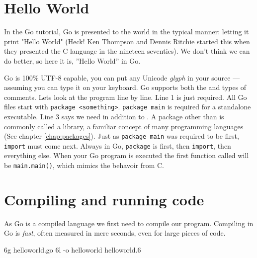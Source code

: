 \section{Hello World}
\label{sec:hello world}
In the Go tutorial, Go is presented to the world in the typical
manner: letting it print "Hello World" (Heck! Ken Thompson and
Dennis Ritchie started this when they presented the C language in 
the nineteen seventies). We don't think we can do better, so 
here it is, ''Hello World'' in Go.


Go is 100\% UTF-8 capable, you can put any Unicode
\emph{glyph} in your source --- assuming you can type it on your keyboard.
Go supports both the \texttt{\rem{/* */}} and \texttt{\rem{//}} types of comments. 
Lets look at the program line by line.
Line 1 is just required.  All Go files start with \lstinline{package <something>}.
\lstinline{package main} is required for a standalone executable.  Line 3 says
we need  in addition to .  A package other than
 is commonly called a library, a familiar concept of many programming
languages (See chapter \ref{chap:packages}). 
Just as \lstinline{package main} was required to be first, 
\lstinline{import} must come next. Always in Go, \lstinline{package} is first, then
\lstinline{import}, then everything else.
When your Go program is executed the first function called will be
\lstinline{main.main()}, which mimics the behavoir from C.

\section{Compiling and running code}
As Go is a compiled language we first
need to compile our program. Compiling in Go is \emph{fast}, often
measured in mere seconds, even for large pieces of code.
\begin{display}
\pr 6g helloworld.go \qquad\qquad\qquad{}
\pr 6l -o helloworld helloworld.6 \qquad{}
\end{display}

